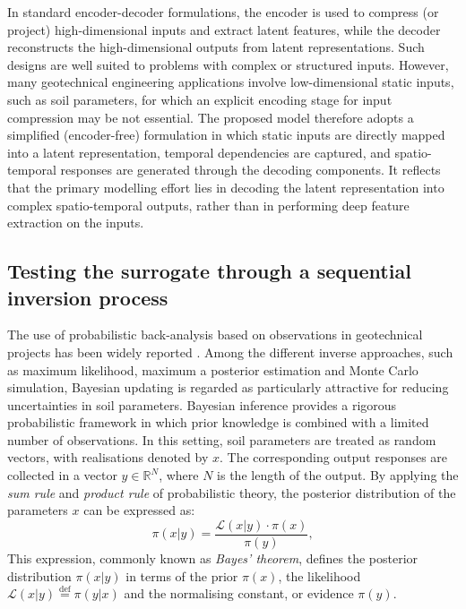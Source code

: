 In standard encoder-decoder formulations, the encoder is used to compress (or project) high-dimensional inputs and extract latent features, while the decoder reconstructs the high-dimensional outputs from latent representations. Such designs are well suited to problems with complex or structured inputs. However, many geotechnical engineering applications involve low-dimensional static inputs, such as soil parameters, for which an explicit encoding stage for input compression may be not essential. The proposed model therefore adopts a simplified (encoder-free) formulation in which static inputs are directly mapped into a latent representation, temporal dependencies are captured, and spatio-temporal responses are generated through the decoding components. It reflects that the primary modelling effort lies in decoding the latent representation into complex spatio-temporal outputs, rather than in performing deep feature extraction on the inputs.

\subsection{Testing the surrogate through a sequential inversion process}\label{sec: SBI}\noindent
The use of probabilistic back-analysis based on observations in geotechnical projects has been widely reported \parencite{hsein2013, lo2019, jin2021}. Among the different inverse approaches, such as maximum likelihood, maximum a posterior estimation and Monte Carlo simulation, Bayesian updating is regarded as particularly attractive for reducing uncertainties in soil parameters. Bayesian inference provides a rigorous probabilistic framework in which prior knowledge is combined with a limited number of observations. In this setting, soil parameters are treated as random vectors, with realisations denoted by $x$. The corresponding output responses are collected in a vector $y \in \mathbb{R}^{N}$, where $N$ is the length of the output. By applying the \textit{sum rule} and \textit{product rule} of probabilistic theory, the posterior distribution of the parameters $x$ can be expressed as:
\begin{equation}
\pi(x|y) = \frac{{\mathcal{L}(x|y) \cdot \pi(x)}}{{\pi(y)}} \label{equation Bayes},
\end{equation}
This expression, commonly known as \textit{Bayes' theorem}, defines the posterior distribution $\pi(x|y)$ in terms of the prior $\pi(x)$, the likelihood $\mathcal{L}(x|y)\stackrel{\mathrm{def}}{=}\pi(y|x)$
and the normalising constant, or evidence $\pi(y)$.

